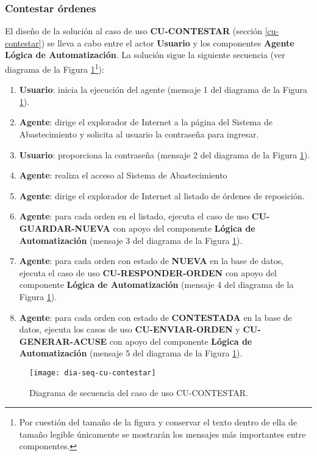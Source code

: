 \subsubsection{Contestar órdenes}
El diseño de la solución al caso de uso \textbf{CU-CONTESTAR} (sección \ref{cu-contestar}) se lleva a cabo entre el actor \textbf{Usuario} y los componentes \textbf{Agente} \textbf{Lógica de Automatización}. La solución sigue la siguiente secuencia (ver diagrama de la Figura \ref{fig:dia-seq-cu-contestar}\footnote{Por cuestión del tamaño de la figura y conservar el texto dentro de ella de tamaño legible únicamente se mostrarán los mensajes más importantes entre componentes.}):
\begin{enumerate}
	\item \textbf{Usuario}: inicia la ejecución del agente (mensaje 1 del diagrama de la Figura \ref{fig:dia-seq-cu-contestar}).
	\item \textbf{Agente}: dirige el explorador de Internet a la página del Sistema de Abastecimiento y solicita al usuario la contraseña para ingresar.
	\item \textbf{Usuario}: proporciona la contraseña (mensaje 2 del diagrama de la Figura \ref{fig:dia-seq-cu-contestar}).
	\item \textbf{Agente}: realiza el acceso al Sistema de Abastecimiento
	\item \textbf{Agente}: dirige el explorador de Internet al listado de órdenes de reposición.
	\item \textbf{Agente}: para cada orden en el listado, ejecuta el caso de uso \textbf{CU-GUARDAR-NUEVA} con apoyo del componente \textbf{Lógica de Automatización} (mensaje 3 del diagrama de la Figura \ref{fig:dia-seq-cu-contestar}).
	\item \textbf{Agente}: para cada orden con estado de \textbf{NUEVA} en la base de datos, ejecuta el caso de uso \textbf{CU-RESPONDER-ORDEN} con apoyo del componente \textbf{Lógica de Automatización} (mensaje 4 del diagrama de la Figura \ref{fig:dia-seq-cu-contestar}).
	\item \textbf{Agente}: para cada orden con estado de \textbf{CONTESTADA} en la base de datos, ejecuta los casos de uso \textbf{CU-ENVIAR-ORDEN} y \textbf{CU-GENERAR-ACUSE} con apoyo del componente \textbf{Lógica de Automatización} (mensaje 5 del diagrama de la Figura \ref{fig:dia-seq-cu-contestar}).
\end{enumerate}

\begin{figure}[h]
	\centering
	\texttt{[image: dia-seq-cu-contestar]}
	\caption{Diagrama de secuencia del caso de uso CU-CONTESTAR.}
	\label{fig:dia-seq-cu-contestar}
\end{figure}

